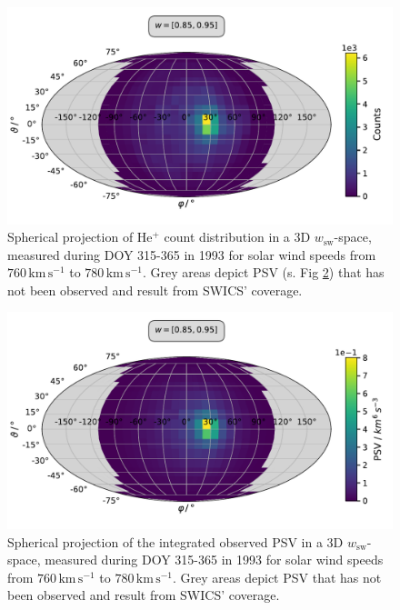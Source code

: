 \begin{figure}[h]
	\includegraphics[width=1\textwidth]{Figures/sky_counts.pdf}
	\centering
	\caption{Spherical projection of $\mathrm{He^{+}}$ count distribution in a 3D $w_\mathrm{sw}$-space, measured during DOY 315-365 in 1993 for solar wind speeds from $760 \, \mathrm{km\,s^{-1}}$ to $780 \, \mathrm{km\,s^{-1}}$. Grey areas depict PSV (s. Fig \ref{fig:sky_norm}) that has not been observed and result from SWICS' coverage.}
	\label{fig:sky_counts}
\end{figure}
\begin{figure}[h]
	\includegraphics[width=1\textwidth]{Figures/sky_norm.pdf}
	\centering
	\caption{Spherical projection of the integrated observed PSV in a 3D $w_\mathrm{sw}$-space, measured during DOY 315-365 in 1993 for solar wind speeds from $760 \, \mathrm{km\,s^{-1}}$ to $780 \, \mathrm{km\,s^{-1}}$. Grey areas depict PSV that has not been observed and result from SWICS' coverage.}
	\label{fig:sky_norm}
\end{figure}

